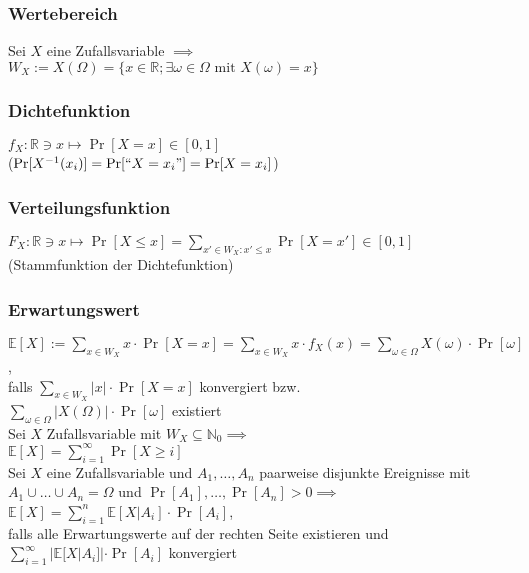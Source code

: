 \documentclass[a4paper,9pt]{extarticle}
\begin{document}
\subsubsection*{Wertebereich}
Sei $X$ eine Zufallsvariable $\implies$ \\
$W_X := X(\Omega) = \{x \in \mathbb{R}; \exists \omega \in \Omega \text{ mit } X(\omega) = x\}$

\subsubsection*{Dichtefunktion}
$f_X : \mathbb{R} \ni x \mapsto \Pr[X = x] \in [0,1]$ \\
($\Pr[X^{-1}(x_i)] = \Pr[``X = x_i"] = \Pr[X = x_i]$)

\subsubsection*{Verteilungsfunktion}
$F_X : \mathbb{R} \ni x \mapsto \Pr[X ≤ x] = \sum_{x' \in W_X : x' ≤ x} \Pr[X = x'] \in [0,1]$
(Stammfunktion der Dichtefunktion)

\subsubsection*{Erwartungswert}
$\mathbb{E}[X] := \sum_{x \in W_X} x ⋅ \Pr[X = x] = \sum_{x \in W_X} x ⋅ f_X(x) = \sum_{\omega \in \Omega} X(\omega) ⋅ \Pr[\omega]$, \\
falls $\sum_{x \in W_X} |x| ⋅ \Pr[X = x]$ konvergiert bzw. \\
$\sum_{\omega \in \Omega} |X(\Omega)| ⋅ \Pr[\omega]$ existiert \\

Sei $X$ Zufallsvariable mit $W_X \subseteq \mathbb{N}_0 \implies$ \\
$\mathbb{E}[X] = \sum_{i=1}^{∞} \Pr[X ≥ i]$ \\

Sei $X$ eine Zufallsvariable und $A_1, \dots, A_n$ paarweise disjunkte Ereignisse mit $A_1 \cup \dots \cup A_n = \Omega$ und $\Pr[A_1], \dots, \Pr[A_n] > 0 \implies$ \\
$\mathbb{E}[X] = \sum_{i=1}^n \mathbb{E}[X|A_i] ⋅ \Pr[A_i]$, \\
falls alle Erwartungswerte auf der rechten Seite existieren und \\
$\sum_{i=1}^∞ |\mathbb{E}[X|A_i]| ⋅ \Pr[A_i]$ konvergiert
\end{document}
